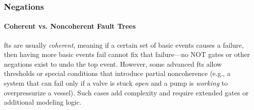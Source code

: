 \subsubsection{Negations}
\paragraph{Coherent vs. Noncoherent Fault Trees}
\acrshort{ft}s are usually \emph{coherent}, meaning if a certain set of basic events causes a failure, then having more basic events fail cannot fix that failure—no NOT gates or other negations exist to undo the top event. However, some advanced \acrshort{ft}s allow thresholds or special conditions that introduce partial noncoherence (e.g., a system that can fail only if a valve is stuck \emph{open} and a pump is \emph{working} to overpressurize a vessel). Such cases add complexity and require extended gates or additional modeling logic.
